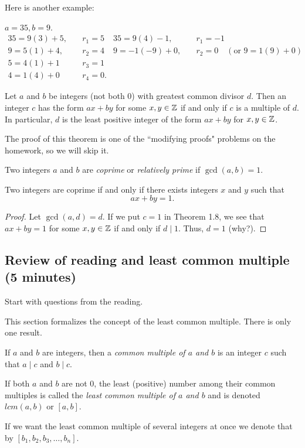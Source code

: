 \documentclass[letterpaper, 11 pt]{article}
\begin{document}
Here is another example:

\begin{example}
 $a=35, b=9$.
\begin{align*}
 35=9(3)+5,& \quad r_1=5 &35=9(4)-1, & \quad r_1=-1\\
 9=5(1)+4,& \quad r_2=4 & 9=-1(-9)+0, & \quad r_2=0 \quad (\textrm{or $9=1(9)+0$})\\
 5=4(1)+1 & \quad r_3=1\\
 4=1(4)+0 & \quad r_4=0.
\end{align*}
\end{example}

\begin{thm}[Theorem 1.8]
Let $a$ and $b$ be integers (not both 0) with greatest common divisor $d$. Then an integer $c$ has the form $ax+by$ for some $x,y\in\mathbb Z$ if and only if $c$ is a multiple of $d$. In particular,  $d$ is the least positive integer of the form $ax+by$ for $x,y\in\mathbb Z$.
\end{thm}

The proof of this theorem is one of the ``modifying proofs" problems on the homework, so we will skip it.

\begin{defn}
Two integers $a$ and $b$ are \emph{coprime} or \emph{relatively prime} if $\gcd(a,b)=1$. 
\end{defn}

\begin{cor}[Corollary 1.9]
 Two integers are coprime if and only if there exists integers $x$ and $y$ such that \[ax+by=1.\]
\end{cor}
\begin{proof}
 Let $\gcd(a,d)=d$. If we put $c=1$ in Theorem 1.8, we see that $ax+by=1$ for some $x,y\in\mathbb Z$ if and only if $d\mid 1$. Thus, $d=1$ (why?).
\end{proof}

\subsection{Review of reading and least common multiple (5 minutes)} 
Start with questions from the reading.

This section formalizes the concept of the least common multiple. There is only one result. 

\begin{defn} If $a$ and $b$ are integers, then a \emph{common multiple of $a$ and $b$} is an integer $c$ such that $a\mid c$ and $b\mid c$.

 If both $a$ and $b$ are not $0$, the least (positive) number among their common multiples  is called the \emph{least common multiple of $a$ and $b$} and is denoted $lcm(a,b)$ or  $[a,b]$. 
 
If we want the least common multiple of several integers at once we denote that by $[b_1,b_2,b_3,\dots,b_n]$.
\end{defn}
\end{document}
